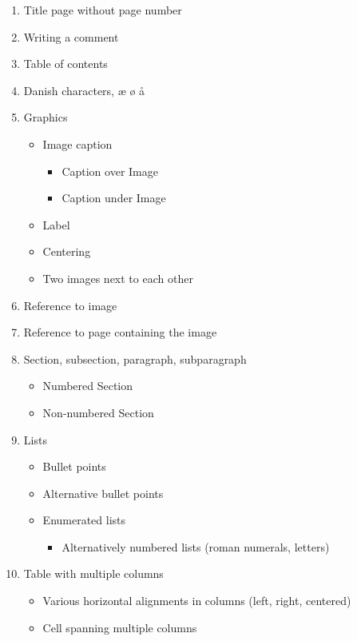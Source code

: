 \begin{enumerate}
    \item Title page without page number
    \item Writing a comment
    \item Table of contents
    \item Danish characters, æ ø å
    \item Graphics
    \begin{itemize}
        \item Image caption
        \begin{itemize}
            \item Caption over Image
            \item Caption under Image
        \end{itemize}
        \item Label
        \item Centering
        \item Two images next to each other
    \end{itemize}
    \item Reference to image
    \item Reference to page containing the image
    \item Section, subsection, paragraph, subparagraph
        \begin{itemize}
            \item Numbered Section
            \item Non-numbered Section
        \end{itemize}
    \item Lists
        \begin{itemize}
            \item Bullet points
            \item Alternative bullet points
            \item Enumerated lists
                \begin{itemize}
                    \item Alternatively numbered lists (roman numerals, letters)
                \end{itemize}
        \end{itemize}
    \item Table with multiple columns
        \begin{itemize}
            \item Various horizontal alignments in columns (left, right, centered)
            \item Cell spanning multiple columns

\end{itemize}
\end{enumerate}
